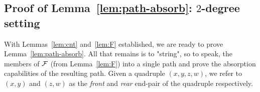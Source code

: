 \documentclass[11pt,reqno]{amsart}
\def\Fref{\mathrm{\ref{lem:F}}}
\begin{document}

\subsection{Proof of Lemma~\ref{lem:path-absorb}: $2$-degree setting}\label{sec:proof-absorb-1}

With Lemmas~\ref{lem:cnt} and~\ref{lem:F} established, we are ready to prove Lemma~\ref{lem:path-absorb}. All that remains is to "string", so to speak, the members of $\mathcal{F}$ (from Lemma~\ref{lem:F}) into a single path and prove the absorption capabilities of the resulting path. 
Given a quadruple $(x,y,z,w)$, we refer to $(x,y)$ and $(z,w)$ as the {\em front} and {\em rear} end-pair of the quadruple respectively. 
\end{document}
